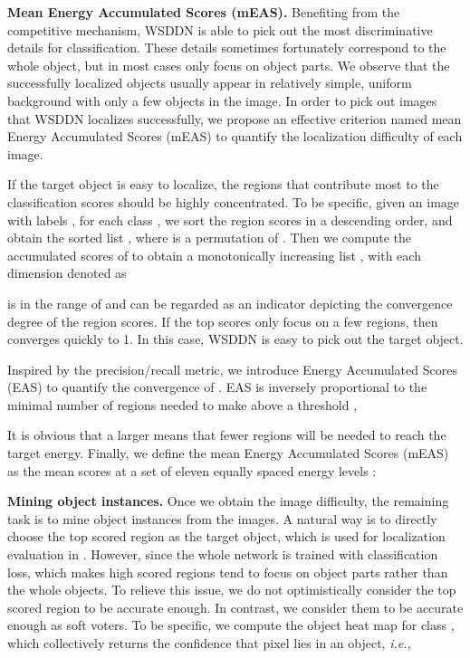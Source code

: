 \documentclass[10pt,twocolumn,letterpaper]{article}
\begin{document}
\textbf{Mean Energy Accumulated Scores (mEAS).} Benefiting from the competitive mechanism, WSDDN is able to pick out the most discriminative details for classification. These details sometimes fortunately correspond to the whole object, but in most cases only focus on object parts. We observe that the successfully localized objects usually appear in relatively simple, uniform background with only a few objects in the image. In order to pick out images that WSDDN localizes successfully, we propose an effective criterion named mean Energy Accumulated Scores (mEAS) to quantify the localization difficulty of each image.

If the target object is easy to localize, the regions that contribute most to the classification scores should be highly concentrated.
To be specific, given an image  with labels , for each class , we sort the region scores  in a descending order, and obtain the sorted list , where  is a permutation of . Then we compute the accumulated scores of  to obtain a monotonically increasing list , with each dimension denoted as

 is in the range of  and can be regarded as an indicator depicting the convergence degree of the region scores. If the top scores only focus on a few regions, then  converges quickly to 1. In this case, WSDDN is easy to pick out the target object.

Inspired by the precision/recall metric, we introduce Energy Accumulated Scores (EAS) to quantify the convergence of . EAS is inversely proportional to the minimal number of regions needed to make  above a threshold ,

It is obvious that a larger  means that fewer regions will be needed to reach the target energy. Finally, we define the mean Energy Accumulated Scores (mEAS) as the mean scores at a set of eleven equally spaced energy levels :



\textbf{Mining object instances.} Once we obtain the image difficulty, the remaining task is to mine object instances from the images. A natural way is to directly choose the top scored region as the target object, which is used for localization evaluation in \cite{bency2016weakly}. However, since the whole network is trained with classification loss, which makes high scored regions tend to focus on object parts rather than the whole objects. To relieve this issue, we do not optimistically consider the top scored region to be accurate enough. In contrast, we consider them to be accurate enough as soft voters. To be specific, we compute the object heat map  for class , which collectively returns the confidence that pixel  lies in an object, \emph{i.e.,}
\end{document}
